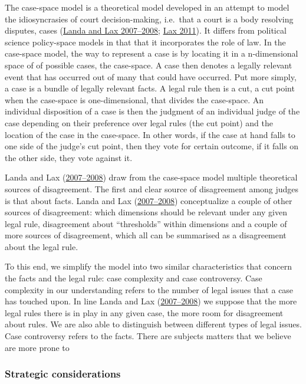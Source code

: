 \documentclass[
  11pt,
]{article}
\begin{document}
The case-space model is a theoretical model developed in an attempt to
model the idiosyncrasies of court decision-making, i.e.~that a court is
a body resolving disputes, cases
(\protect\hyperlink{ref-landaDisagreementsCollegialCourts2007}{Landa and
Lax 2007--2008}; \protect\hyperlink{ref-laxNewJudicialPolitics2011}{Lax
2011}). It differs from political science policy-space models in that
that it incorporates the role of law. In the case-space model, the way
to represent a case is by locating it in a n-dimensional space of of
possible cases, the case-space. A case then denotes a legally relevant
event that has occurred out of many that could have occurred. Put more
simply, a case is a bundle of legally relevant facts. A legal rule then
is a cut, a cut point when the case-space is one-dimensional, that
divides the case-space. An individual disposition of a case is then the
judgment of an individual judge of the case depending on their
preference over legal rules (the cut point) and the location of the case
in the case-space. In other words, if the case at hand falls to one side
of the judge's cut point, then they vote for certain outcome, if it
falls on the other side, they vote against it.

Landa and Lax
(\protect\hyperlink{ref-landaDisagreementsCollegialCourts2007}{2007--2008})
draw from the case-space model multiple theoretical sources of
disagreement. The first and clear source of disagreement among judges is
that about facts. Landa and Lax
(\protect\hyperlink{ref-landaDisagreementsCollegialCourts2007}{2007--2008})
conceptualize a couple of other sources of disagreement: which
dimensions should be relevant under any given legal rule, disagreement
about ``thresholds'' within dimensions and a couple of more sources of
disagreement, which all can be summarised as a disagreement about the
legal rule.

To this end, we simplify the model into two similar characteristics that
concern the facts and the legal rule: case complexity and case
controversy. Case complexity in our understanding refers to the number
of legal issues that a case has touched upon. In line Landa and Lax
(\protect\hyperlink{ref-landaDisagreementsCollegialCourts2007}{2007--2008})
we suppose that the more legal rules there is in play in any given case,
the more room for disagreement about rules. We are also able to
distinguish between different types of legal issues. Case controversy
refers to the facts. There are subjects matters that we believe are more
prone to

\hypertarget{strategic-considerations}{%
\subsubsection{Strategic
considerations}\label{strategic-considerations}}
\end{document}
